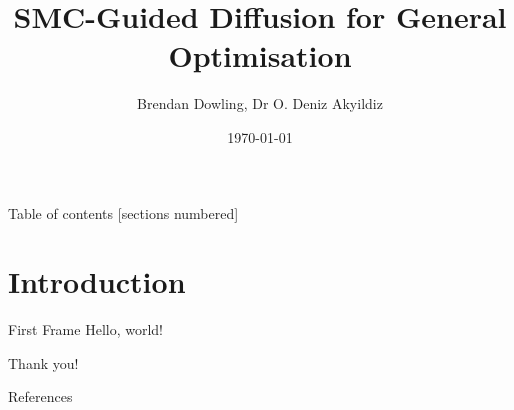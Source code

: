 \documentclass{beamer}
\title{SMC-Guided Diffusion for General Optimisation}
\date{\today}
\author{Brendan Dowling, Dr O. Deniz Akyildiz}
\institute{Imperial College London}
\begin{document}
    \maketitle

    \begin{frame}{Table of contents}
        [sections numbered]
        \tableofcontents[hideallsubsections]
    \end{frame}

    \section{Introduction}
    \begin{frame}{First Frame}
        Hello, world! \textcite{andersonReversetimeDiffusionEquation1982,hoDenoisingDiffusionProbabilistic2020,douDiffusionPosteriorSampling2023,akyildizParallelSequentialMonte2020,delmoralCentralLimitTheorems2011}
    \end{frame}

    {
    \begin{frame}[standout]
        Thank you!
    \end{frame}
    }

    \appendix

    \begin{frame}[allowframebreaks]{References}
        \printbibliography[heading=none]
    \end{frame}
\end{document}
